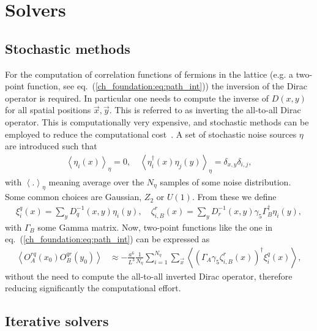 
\chapter{Solvers}
\label{appex_solvers}

\section{Stochastic methods}

For the computation of correlation functions of fermions in the lattice (e.g. a two-point function, see eq.~(\ref{ch_foundation:eq:path_int})) the inversion of the Dirac operator is required. In particular one needs to compute the inverse of $D(x,y)$ for all spatial positions $\vec{x},\vec{y}$. This is referred to as inverting the all-to-all Dirac operator. This is computationally very expensive, and stochastic methods can be employed to reduce the computational cost~\citep{Luscher:2010ae}. A set of stochastic noise sources $\eta$ are introduced such that
\begin{gather}
\left<\eta_i(x)\right>_{\eta}=0, \quad \left<\eta_i^{\dagger}(x)\eta_j(y)\right>_{\eta}=\delta_{x,y}\delta_{i,j},
\end{gather}
with $\left<.\right>_{\eta}$ meaning average over the $N_{\eta}$ samples of some noise distribution. Some common choices are Gaussian, $Z_2$ or $U(1)$. From these we define
\begin{gather}
\xi_i^q(x)=\sum_yD^{-1}_q(x,y)\eta_i(y), \quad \zeta_{i,B}^r(x)=\sum_yD^{-1}_r(x,y)\gamma_5\Gamma_B^{\dagger}\eta_i(y),
\end{gather}
with $\Gamma_B$ some Gamma matrix. Now, two-point functions like the one in eq.~(\ref{ch_foundation:eq:path_int}) can be expressed as
\begin{align}
\left<O^{rq}_A(x_0)O^{qr}_B(y_0)\right>&\approx -\frac{a^6}{L^3}\frac{1}{N_{\eta}}\sum_{i=1}^{N_{\eta}}\sum_{\vec{x}}\left<(\Gamma_A\gamma_5\zeta^r_{i,B}(x))^{\dagger}\xi^q_i(x)\right>,
\end{align}
without the need to compute the all-to-all inverted Dirac operator, therefore reducing significantly the computational effort.

\section{Iterative solvers}

